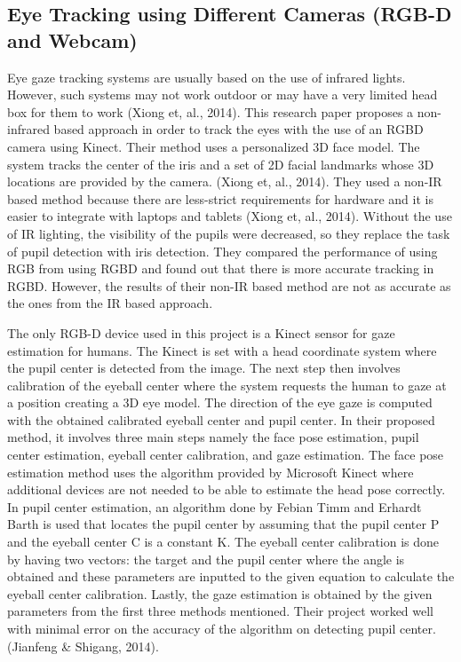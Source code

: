 \subsection{Eye Tracking using Different Cameras (RGB-D and Webcam)}
Eye gaze tracking systems are usually based on the use of infrared lights. However, such systems may not work outdoor or may have a very limited head box for them to work (Xiong et, al., 2014). This research paper proposes a non-infrared based approach in order to track the eyes with the use of an RGBD camera using Kinect. Their method uses a personalized 3D face model. The system tracks the center of the iris and a set of 2D facial landmarks whose 3D locations are provided by the camera. (Xiong et, al., 2014). They used a non-IR based method because there are less-strict requirements for hardware and it is easier to integrate with laptops and tablets (Xiong et, al., 2014). Without the use of IR lighting, the visibility of the pupils were decreased, so they replace the task of pupil detection with iris detection. They compared the performance of using RGB from using RGBD and found out that there is more accurate tracking in RGBD. However, the results of their non-IR based method are not as accurate as the ones from the IR based approach. 
\newline

The only RGB-D device used in this project is a Kinect sensor for gaze estimation for humans. The Kinect is set with a head coordinate system where the pupil center is detected from the image. The next step then involves calibration of the eyeball center where the system requests the human to gaze at a position creating a 3D eye model. The direction of the eye gaze is computed with the obtained calibrated eyeball center and pupil center. In their proposed method, it involves three main steps namely the face pose estimation, pupil center estimation, eyeball center calibration, and gaze estimation. The face pose estimation method uses the algorithm provided by Microsoft Kinect where additional devices are not needed to be able to estimate the head pose correctly. In pupil center estimation, an algorithm done by Febian Timm and Erhardt Barth is used that locates the pupil center by assuming that the pupil center P and the eyeball center C is a constant K. The eyeball center calibration is done by having two vectors: the target and the pupil center where the angle is obtained and these parameters are inputted to the given equation to calculate the eyeball center calibration. Lastly, the gaze estimation is obtained by the given parameters from the first three methods mentioned. Their project worked well with minimal error on the accuracy of the algorithm on detecting pupil center. (Jianfeng \& Shigang, 2014).
\newline

